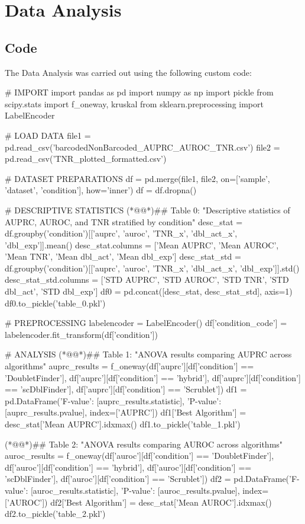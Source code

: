 \documentclass[11pt]{article}
\begin{document}
\section{Data Analysis}
\subsection{{Code}}
The Data Analysis was carried out using the following custom code:

\begin{python}

# IMPORT
import pandas as pd
import numpy as np
import pickle
from scipy.stats import f_oneway, kruskal
from sklearn.preprocessing import LabelEncoder

# LOAD DATA
file1 = pd.read_csv('barcodedNonBarcoded_AUPRC_AUROC_TNR.csv')
file2 = pd.read_csv('TNR_plotted_formatted.csv')

# DATASET PREPARATIONS
df = pd.merge(file1, file2, on=['sample', 'dataset', 'condition'], how='inner')
df = df.dropna()

# DESCRIPTIVE STATISTICS
(*@@*)## Table 0: "Descriptive statistics of AUPRC, AUROC, and TNR stratified by condition"
desc_stat = df.groupby('condition')[['auprc', 'auroc', 'TNR_x', 'dbl_act_x', 'dbl_exp']].mean()
desc_stat.columns = ['Mean AUPRC', 'Mean AUROC', 'Mean TNR', 'Mean dbl_act', 'Mean dbl_exp']
desc_stat_std = df.groupby('condition')[['auprc', 'auroc', 'TNR_x', 'dbl_act_x', 'dbl_exp']].std()
desc_stat_std.columns = ['STD AUPRC', 'STD AUROC', 'STD TNR', 'STD dbl_act', 'STD dbl_exp']
df0 = pd.concat([desc_stat, desc_stat_std], axis=1)
df0.to_pickle('table_0.pkl')

# PREPROCESSING
labelencoder = LabelEncoder()
df['condition_code'] = labelencoder.fit_transform(df['condition'])

# ANALYSIS
(*@@*)## Table 1: "ANOVA results comparing AUPRC across algorithms"
auprc_results = f_oneway(df['auprc'][df['condition'] == 'DoubletFinder'],
                         df['auprc'][df['condition'] == 'hybrid'],
                         df['auprc'][df['condition'] == 'scDblFinder'],
                         df['auprc'][df['condition'] == 'Scrublet'])
df1 = pd.DataFrame({'F-value': [auprc_results.statistic], 'P-value': [auprc_results.pvalue]}, index=['AUPRC'])
df1['Best Algorithm'] = desc_stat['Mean AUPRC'].idxmax()
df1.to_pickle('table_1.pkl')

(*@@*)## Table 2: "ANOVA results comparing AUROC across algorithms"
auroc_results = f_oneway(df['auroc'][df['condition'] == 'DoubletFinder'],
                         df['auroc'][df['condition'] == 'hybrid'],
                         df['auroc'][df['condition'] == 'scDblFinder'],
                         df['auroc'][df['condition'] == 'Scrublet'])
df2 = pd.DataFrame({'F-value': [auroc_results.statistic], 'P-value': [auroc_results.pvalue]}, index=['AUROC'])
df2['Best Algorithm'] = desc_stat['Mean AUROC'].idxmax()
df2.to_pickle('table_2.pkl')


\end{python}
\end{document}
